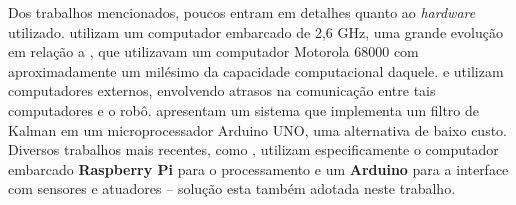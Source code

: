 Dos trabalhos mencionados, poucos entram em detalhes quanto ao \emph{hardware} utilizado. \cite{oubbati2005velocity} utilizam um computador embarcado de 2,6 GHz, uma grande evolução em relação a \cite{feng1989servo}, que utilizavam um computador Motorola 68000 com aproximadamente um milésimo da capacidade computacional daquele. \cite{takemura2007development} e \cite{loh2003mechatronics} utilizam computadores externos, envolvendo atrasos na comunicação entre tais computadores e o robô. \cite{lowcostIMU} apresentam um sistema que implementa um filtro de Kalman em um microprocessador Arduino UNO, uma alternativa de baixo custo. Diversos trabalhos mais recentes, como \cite{krinkin2015design}, utilizam especificamente o computador embarcado \textbf{Raspberry Pi} para o processamento e um \textbf{Arduino} para a interface com sensores e atuadores -- solução esta também adotada neste trabalho.
